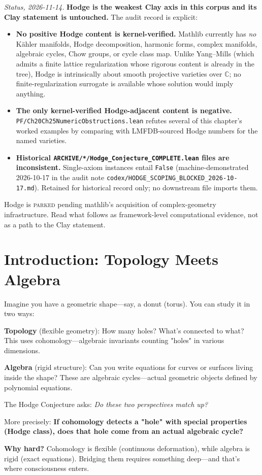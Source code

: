 \begin{chapterobjectives}
\emph{Status, 2026-11-14.}  \textbf{Hodge is the weakest Clay axis in this corpus and its Clay statement is untouched.}  The audit record is explicit:
\begin{itemize}
\item \textbf{No positive Hodge content is kernel-verified.}  Mathlib
  currently has \emph{no} K\"ahler manifolds, Hodge decomposition,
  harmonic forms, complex manifolds, algebraic cycles, Chow groups,
  or cycle class map.  Unlike Yang--Mills (which admits a finite
  lattice regularization whose rigorous content is already in the
  tree), Hodge is intrinsically about smooth projective varieties
  over $\mathbb{C}$; no finite-regularization surrogate is available
  whose solution would imply anything.
\item \textbf{The only kernel-verified Hodge-adjacent content is
  negative.}  \texttt{PF/Ch20Ch25NumericObstructions.lean}
  refutes several of this chapter's worked examples by comparing with
  LMFDB-sourced Hodge numbers for the named varieties.
\item \textbf{Historical \texttt{ARCHIVE/*/Hodge\_Conjecture\_COMPLETE.lean}
  files are inconsistent.}  Single-axiom instances entail \texttt{False}
  (machine-demonstrated 2026-10-17 in the audit note
  \texttt{codex/HODGE\_SCOPING\_BLOCKED\_2026-10-17.md}).  Retained for
  historical record only; no downstream file imports them.
\end{itemize}
Hodge is \textsc{parked} pending mathlib's acquisition of complex-geometry infrastructure.  Read what follows as framework-level computational evidence, not as a path to the Clay statement.
\end{chapterobjectives}

\section{Introduction: Topology Meets Algebra}

\begin{intuitive}
Imagine you have a geometric shape—say, a donut (torus). You can study it in two ways:

\textbf{Topology} (flexible geometry): How many holes? What's connected to what? This uses cohomology—algebraic invariants counting "holes" in various dimensions.

\textbf{Algebra} (rigid structure): Can you write equations for curves or surfaces living inside the shape? These are algebraic cycles—actual geometric objects defined by polynomial equations.

The Hodge Conjecture asks: \textit{Do these two perspectives match up?}

More precisely: \textbf{If cohomology detects a "hole" with special properties (Hodge class), does that hole come from an actual algebraic cycle?}

\textbf{Why hard?} Cohomology is flexible (continuous deformation), while algebra is rigid (exact equations). Bridging them requires something deep—and that's where consciousness enters.
\end{intuitive}

